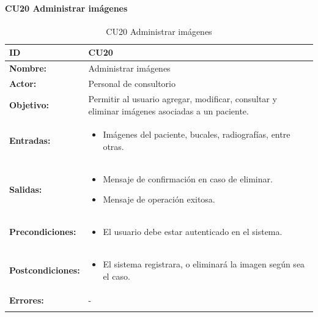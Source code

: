 
\paragraph{CU20 Administrar imágenes}

\begin{longtable}[H]{|p{}|p{12cm}|}
\hline\textbf{ID}         
& \textbf{CU20}            \\ \hline
\textbf{Nombre:}          
& Administrar imágenes   \\ \hline
\textbf{Actor:}          
& Personal de consultorio   \\ \hline
\textbf{Objetivo:}       
& Permitir al usuario agregar, modificar, consultar y eliminar imágenes asociadas a un paciente.\\ \hline
\textbf{Entradas:}  & 
\begin{itemize}[nosep]
\item Imágenes del paciente, bucales, radiografías, entre otras.
\end{itemize}
\\ \hline
\textbf{Salidas:}  & 
\begin{itemize}[nosep]
\item Mensaje de confirmación en caso de eliminar.
\item Mensaje de operación exitosa.
\end{itemize}
\\ \hline
\textbf{Precondiciones:}  &             
\begin{itemize}[nosep]
\item El usuario debe estar autenticado en el sistema.
\end{itemize}
\\ \hline
\textbf{Postcondiciones:} & 
\begin{itemize}[nosep]
\item El sistema registrara, o eliminará la imagen según sea el caso.
\end{itemize}
\\ \hline
\textbf{Errores:} &  -
\\ \hline
\caption{CU20 Administrar imágenes}
\label{table:1}
\end{longtable}

